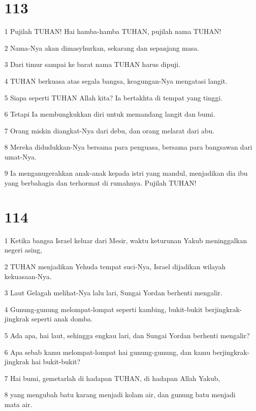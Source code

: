 \chapter{113}

\par 1 Pujilah TUHAN! Hai hamba-hamba TUHAN, pujilah nama TUHAN!
\par 2 Nama-Nya akan dimasyhurkan, sekarang dan sepanjang masa.
\par 3 Dari timur sampai ke barat nama TUHAN harus dipuji.
\par 4 TUHAN berkuasa atas segala bangsa, keagungan-Nya mengatasi langit.
\par 5 Siapa seperti TUHAN Allah kita? Ia bertakhta di tempat yang tinggi.
\par 6 Tetapi Ia membungkukkan diri untuk memandang langit dan bumi.
\par 7 Orang miskin diangkat-Nya dari debu, dan orang melarat dari abu.
\par 8 Mereka didudukkan-Nya bersama para penguasa, bersama para bangsawan dari umat-Nya.
\par 9 Ia menganugerahkan anak-anak kepada istri yang mandul, menjadikan dia ibu yang berbahagia dan terhormat di rumahnya. Pujilah TUHAN!

\chapter{114}

\par 1 Ketika bangsa Israel keluar dari Mesir, waktu keturunan Yakub meninggalkan negeri asing,
\par 2 TUHAN menjadikan Yehuda tempat suci-Nya, Israel dijadikan wilayah kekuasaan-Nya.
\par 3 Laut Gelagah melihat-Nya lalu lari, Sungai Yordan berhenti mengalir.
\par 4 Gunung-gunung melompat-lompat seperti kambing, bukit-bukit berjingkrak-jingkrak seperti anak domba.
\par 5 Ada apa, hai laut, sehingga engkau lari, dan Sungai Yordan berhenti mengalir?
\par 6 Apa sebab kamu melompat-lompat hai gunung-gunung, dan kamu berjingkrak-jingkrak hai bukit-bukit?
\par 7 Hai bumi, gemetarlah di hadapan TUHAN, di hadapan Allah Yakub,
\par 8 yang mengubah batu karang menjadi kolam air, dan gunung batu menjadi mata air.

